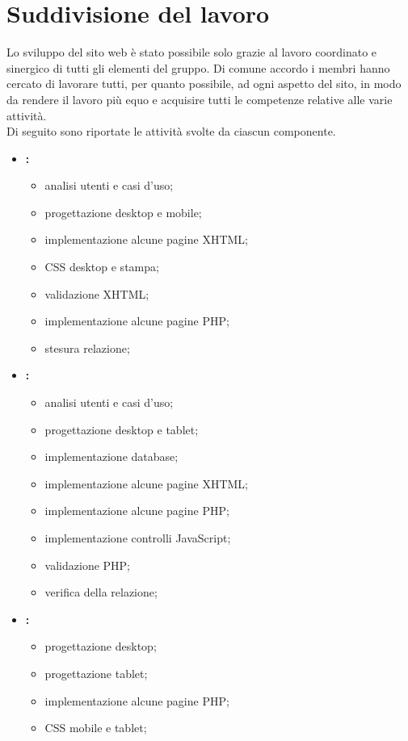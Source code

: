 \section{Suddivisione del lavoro}
\label{suddivisione-del-lavoro}
Lo sviluppo del sito web è stato possibile solo grazie al lavoro coordinato e sinergico di tutti gli elementi del gruppo. Di comune accordo i membri hanno cercato di lavorare tutti, per quanto possibile, ad ogni aspetto del sito, in modo da rendere il lavoro più equo e acquisire tutti le competenze relative alle varie attività. 
\\Di seguito sono riportate le attività svolte da ciascun componente.  
\begin{itemize}
	\item \textbf{\fiamma:}
		\begin{itemize}
			\item analisi utenti e casi d'uso;
			\item progettazione desktop e mobile;
			\item implementazione alcune pagine XHTML;
			\item CSS desktop e stampa;
			\item validazione XHTML;
			\item implementazione alcune pagine PHP;
			\item stesura relazione;
		\end{itemize}
	\item \textbf{\ludo:}
		\begin{itemize}
			\item analisi utenti e casi d'uso;
			\item progettazione desktop e tablet;
			\item implementazione database;
			\item implementazione alcune pagine XHTML;
			\item implementazione alcune pagine PHP;
			\item implementazione controlli JavaScript;
			\item validazione PHP;
			\item verifica della relazione;
		\end{itemize}
	\item \textbf{\perin:}
		\begin{itemize}
			\item progettazione desktop;
			\item progettazione tablet;
			\item implementazione alcune pagine PHP;
			\item CSS mobile e tablet;

\end{itemize}
\end{itemize}
